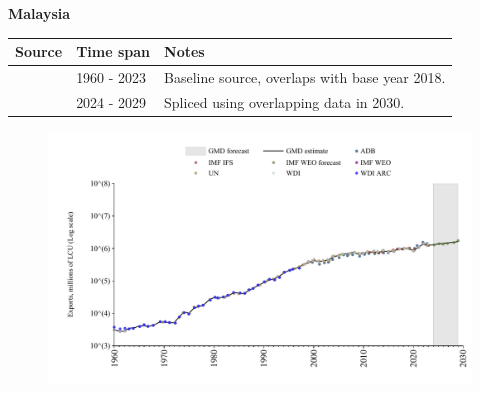 \documentclass[12pt,a4paper,landscape]{article}
\begin{document}
\begin{adjustbox}{max totalsize={\paperwidth}{\paperheight},center}
\begin{minipage}[t][\textheight][t]{\textwidth}
\vspace*{0.5cm}
{}
\begin{center}
{\Large\bfseries Malaysia}
\end{center}
\vspace{0.5cm}
\begin{table}[H]
\centering
\small
\begin{tabular}{|l|l|l|}
\hline
\textbf{Source} & \textbf{Time span} & \textbf{Notes} \\
\hline
\rowcolor{white}\cite{WDI}& 1960 - 2023 &Baseline source, overlaps with base year 2018.\\
\rowcolor{lightgray}\cite{IMF_WEO_forecast}& 2024 - 2029 &Spliced using overlapping data in 2030.\\
\hline
\end{tabular}
\end{table}
\begin{figure}[H]
\centering
\includegraphics[width=\textwidth,height=0.6\textheight,keepaspectratio]{graphs/MYS_exports.pdf}
\end{figure}
\end{minipage}
\end{adjustbox}
\end{document}
